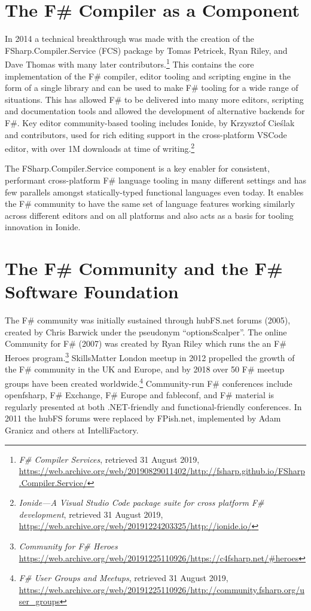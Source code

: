 \documentclass[acmsmall]{acmart}\settopmatter{}
\begin{document}
\section*{The F\# Compiler as a Component}

In 2014 a technical breakthrough was made with the creation of the FSharp.Compiler.Service (FCS) package by
Tomas Petricek, Ryan Riley, and Dave Thomas with many later contributors.\footnote{\textit{F\# Compiler Services}, retrieved 31
August 2019, \url{https://web.archive.org/web/20190829011402/http://fsharp.github.io/FSharp.Compiler.Service/}}
This contains the core implementation of the F\# compiler, editor tooling and scripting engine in the form of a single library and can be used to make F\# tooling
for a wide range of situations.  This has allowed F\# to be delivered into many more editors, scripting and documentation
tools and allowed the development of alternative backends for F\#.   Key editor community-based tooling includes
Ionide, by Krzysztof Cieślak and contributors, used for rich editing support in the cross-platform VSCode editor, with over 1M downloads at time
of writing.\footnote{\textit{Ionide---A Visual Studio Code package suite for cross platform F\# development}, retrieved 31 August 2019, \url{https://web.archive.org/web/20191224203325/http://ionide.io/}}

The FSharp.Compiler.Service component is a key enabler for consistent, performant cross-platform F\# language tooling in many different settings and
has few parallels amongst statically-typed  functional languages even today. It enables the F\# community to have the same set of language features working
similarly across different editors and on all platforms and also acts as a basis for tooling innovation in Ionide.

\section*{The F\# Community and the F\# Software Foundation }

\label{page:community}

The F\# community was initially sustained through hubFS.net forums (2005), created by Chris Barwick under the
pseudonym “optionsScalper”. The online Community for F\# (2007) was created by Ryan Riley which runs the
an F\# Heroes program.\footnote{\textit{Community for F\# Heroes} \url{https://web.archive.org/web/20191225110926/https://c4fsharp.net/\#heroes}}
SkillsMatter London meetup in 2012 propelled the growth of the F\# community in the UK and Europe, and by 2018
over 50 F\# meetup groups have been created worldwide.\footnote{\textit{F\# User Groups and Meetups}, retrieved 31 August 2019, \url{https://web.archive.org/web/20191225110926/http://community.fsharp.org/user_groups}}
Community-run F\# conferences include openfsharp, F\# Exchange, F\# Europe and fableconf, and F\# material is regularly presented at both .NET-friendly and functional-friendly conferences. In 2011 the hubFS forums were replaced by FPish.net, implemented by Adam Granicz and others at IntelliFactory. 
\end{document}
